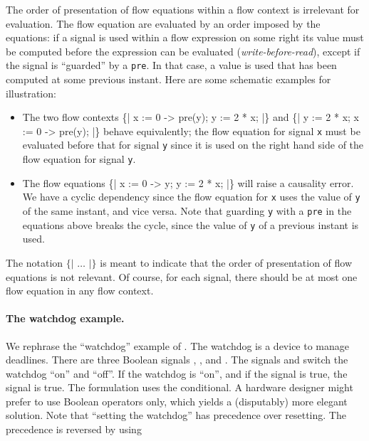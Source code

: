 The order of presentation of flow equations within a flow context is 
irrelevant for evaluation. The flow equation are evaluated by an
order imposed by the equations: if a signal is used 
within a flow expression on some right its value must be computed 
before the expression can be evaluated (\emph{write-before-read}), except
if the signal is ``guarded'' by a \texttt{pre}. In that case, a value is used
that has been computed at some previous instant. Here are some schematic 
examples for illustration:
\begin{itemize}
\item The two flow contexts
%
\BEP
   \{|  x := 0 -> pre(y);
       y := 2 * x;
   |\}    
\EEP
%
and
%
\BEP
   \{|  y := 2 * x;
       x := 0 -> pre(y);
   |\} 
\EEP   
%
behave equivalently; the flow equation for signal \texttt{x} must be
evaluated before that for signal \texttt{y} since it is used on the right
hand side of the flow equation for signal \texttt{y}.

\item The flow equations 
%
\BEP
   \{|  x := 0 -> y;
       y := 2 * x;
   |\}    
\EEP
%
will raise a causality error. We have a cyclic dependency since the flow
equation for \texttt{x} uses the value of \texttt{y} of the same instant,
and vice versa. Note that guarding \texttt{y} with a \texttt{pre} in the
equations above breaks the cycle, since the value of \texttt{y} of a previous
instant is used.

\end{itemize}
The notation $\texttt{\{| \ldots\  |\}}$ is meant to indicate that the 
order of presentation of flow equations is not relevant. 
Of course, for each signal, there should be at most one flow equation in any
flow context.

\paragraph{The watchdog example.} We rephrase the ``watchdog'' example of \cite{halbwachs}. The watchdog is a device to manage deadlines. There are three Boolean signals , , and . The signals
 and  switch the watchdog ``on'' and ``off''. If the watchdog is ``on'', and if the signal  is true, the signal  is true.
%
%
The formulation uses the conditional.
A hardware designer might prefer to use Boolean operators only, which 
yields a (disputably) more elegant solution.
%
%
Note that ``setting the watchdog'' has precedence over resetting. The
precedence is reversed by using
%
%

